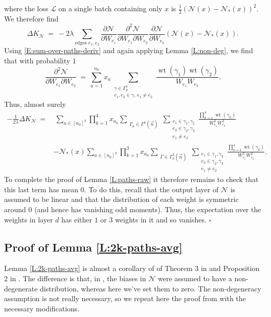 \documentclass[11pt, reqno]{amsart}
\newcommand{\leb}{\lambda}
\newcommand{\e}{\mathbb E}
\newcommand{\lr}[1]{\ensuremath{\left(#1 \right)}}
\newcommand{\mN}{\mathcal N}
\DeclareMathOperator{\wt}{wt}
\begin{document}
where the loss $\mathcal L$ on a single batch containing only $x$ is $\frac{1}{2}\lr{\mN(x)-\mN_*(x)}^2.$ We therefore find 
\[\Delta K_{\mN}~=~ -2\leb \sum_{\text{edges }e_1,e_2} \frac{\partial \mN}{\partial W_{e_1}}\frac{\partial^2 \mN}{\partial W_{e_1}\partial W_{e_2}}\frac{\partial \mN}{\partial W_{e_2}}\lr{\mN(x)-\mN_*(x)}.\]
Using \eqref{E:sum-over-paths-deriv} and again applying Lemma \ref{L:non-deg}, we find that with probability $1$
\[\frac{\partial^2 \mN}{\partial W_{e_1} \partial W_{e_2} }~=~  \sum_{a=1}^{n_0} x_a \sum_{\substack{\gamma\in \Gamma_a^1\\ e_1,e_2\in \gamma,\, e_1\neq e_2}} \frac{\wt(\gamma_1)\wt(\gamma_2)}{W_{e_1}W_{e_2}}.\]
Thus, almost surely
\begin{align*}
  -\frac{1}{2\leb}\Delta K_{\mN}~=&~  \sum_{a\in [n_0]^4}\prod_{k=1}^4 x_{a_k} \sum_{\substack{\Gamma_a \in \Gamma^4(\vec{n})}} \sum_{\substack{e_1\in \gamma_1,\gamma_2\\ e_2\in \gamma_2,\gamma_3\\e_1\neq e_2}} \frac{\prod_{k=1}^4 \wt(\gamma_k)}{W_{e_1}^2W_{e_2}^2}\\
  &- \mN_*(x)\sum_{a\in [n_0]^3}\prod_{k=1}^3 x_{a_k} \sum_{\substack{\Gamma \in \Gamma_a^3(\vec{n})}} \sum_{\substack{e_1\in \gamma_1,\gamma_2\\ e_2\in \gamma_2,\gamma_3\\ e_1\neq e_2}} \frac{\prod_{k=1}^4 \wt(\gamma_k)}{W_{e_1}^2W_{e_2}^2}.
\end{align*}
To complete the proof of Lemma \ref{L:paths-raw} it therefore remains to check that this last term has mean $0.$ To do this, recall that the output layer of $\mN$ is assumed to be linear and that the distribution of each weight is symmetric around $0$ (and hence has vanishing odd moments). Thus, the expectation over the weights in layer $d$ has either $1$ or $3$ weights in it and so vanishes. \hfill $\square$



\subsection{Proof of Lemma \ref{L:2k-paths-avg}}\label{S:2k-path-avg-pf}
Lemma \ref{L:2k-paths-avg} is almost a corollary of of Theorem 3 in \cite{hanin2018neural} and Proposition 2 in \cite{hanin2018products}. The difference is that, in \cite{hanin2018neural,hanin2018products}, the biases in $\mN$ were assumed to have a non-degenerate distribution, whereas here we've set them to zero. The non-degeneracy assumption is not really necessary, so we repeat here the proof from \cite{hanin2018neural} with the necessary modifications.
\end{document}

